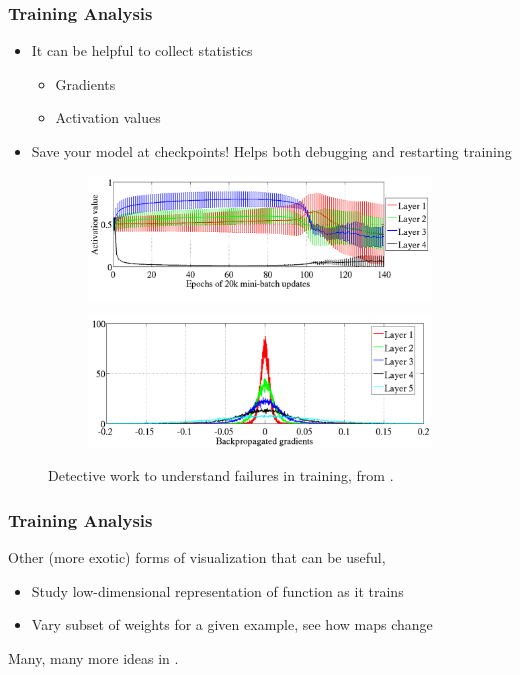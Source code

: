 \documentclass[10pt,mathserif]{beamer}
\begin{document}
\begin{frame}
  \frametitle{Training Analysis}
  \begin{itemize}
  \item It can be helpful to collect statistics
    \begin{itemize}
    \item Gradients
    \item Activation values
    \end{itemize}
  \item Save your model at checkpoints! Helps both debugging and restarting
    training
  \end{itemize}
  \begin{figure}[ht]
    \centering
    \begin{subfigure}{.5\paperwidth}
      \centering
      \includegraphics[width=0.4\paperwidth]{figure/activation_evolution}
    \end{subfigure}
    \begin{subfigure}{.5\paperwidth}
      \centering
      \includegraphics[width=0.4\paperwidth]{figure/backprop_histogram}
    \end{subfigure}
    \caption{Detective work to understand failures in training, from
      \citep{glorot2010understanding}.\label{fig:detective_work} }
  \end{figure}
\end{frame}

\begin{frame}
  \frametitle{Training Analysis}
  Other (more exotic) forms of visualization that can be useful,
  \begin{itemize}
  \item Study low-dimensional representation of function as it trains
  \item Vary subset of weights for a given example, see how maps change
  \end{itemize}
  Many, many more ideas in \citep{bengio2012practical}.

\end{frame}
\end{document}
